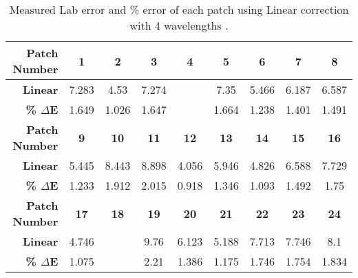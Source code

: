\begin{table}[H]
  \caption{Measured Lab error and \% error of each patch using Linear correction with 4 wavelengths .}\n  \begin{center}
    \begin{tabularx}{\textwidth}{r c c c c c c c c}
    \toprule
        \textbf{Patch Number} & \textbf{1} & \textbf{2} & \textbf{3} & \textbf{4} & \textbf{5} & \textbf{6} & \textbf{7} & \textbf{8}\\ \midrule 
        \textbf{Linear} &7.283 &4.53 &7.274 &\cellcolor{colorred}{12.56} &7.35 &5.466 &6.187 &6.587\\ 
        \textbf{\textbf{\% $\Delta$E}} &1.649 &1.026 &1.647 &\cellcolor{colorred}{2.844} &1.664 &1.238 &1.401 &1.491\\ \midrule 
        \textbf{Patch Number} & \textbf{9} & \textbf{10} & \textbf{11} & \textbf{12} & \textbf{13} & \textbf{14} & \textbf{15} & \textbf{16}\\ \midrule 
        \textbf{Linear} &5.445 &8.443 &8.898 &4.056 &5.946 &4.826 &6.588 &7.729\\ 
        \textbf{\textbf{\% $\Delta$E}} &1.233 &1.912 &2.015 &0.918 &1.346 &1.093 &1.492 &1.75\\ \midrule 
        \textbf{Patch Number} & \textbf{17} & \textbf{18} & \textbf{19} & \textbf{20} & \textbf{21} & \textbf{22} & \textbf{23} & \textbf{24}\\ \midrule 
        \textbf{Linear} &4.746 &\cellcolor{colorgreen}{4.019} &9.76 &6.123 &5.188 &7.713 &7.746 &8.1\\ 
        \textbf{\textbf{\% $\Delta$E}} &1.075 &\cellcolor{colorgreen}{0.91} &2.21 &1.386 &1.175 &1.746 &1.754 &1.834\\ \midrule 
    \bottomrule
    \end{tabularx}
  \end{center}
\end{table}
